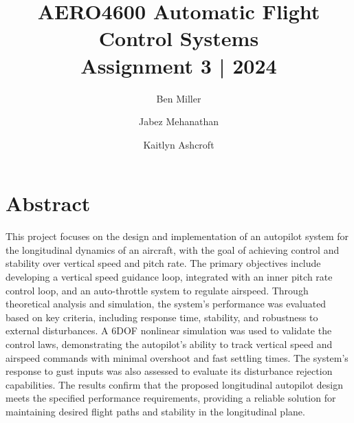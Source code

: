 \documentclass{UoNMCHA}
\numberwithin{equation}{section}
\begin{document}
\title{AERO4600 Automatic Flight Control Systems\\
{\small Assignment 3 | 2024}}

\author[UoNMCHA1]{Ben Miller}
\address[UoNMCHA1]{
Student of Aerospace Systems Engineering,\\
The University of Newcastle, Callaghan, NSW 2308, AUSTRALIA \\
Student Number: c3328484 \\
E-mail: \href{mailto:First.Last@uon.edu.au}{\textsf{c3328484@uon.edu.au}}}

\author[UoNMCHA2]{Jabez Mehanathan}
\address[UoNMCHA2]{
Student of Aerospace Systems Engineering,\\
The University of Newcastle, Callaghan, NSW 2308, AUSTRALIA \\
Student Number: c3355997 \\
E-mail: \href{mailto:First.Last@uon.edu.au}{\textsf{c3355997@uon.edu.au}}}

\author[UoNMCHA3]{Kaitlyn Ashcroft}
\address[UoNMCHA3]{
Student of Aerospace Systems Engineering,\\
The University of Newcastle, Callaghan, NSW 2308, AUSTRALIA \\
Student Number: c3350754  \\
E-mail: \href{mailto:First.Last@uon.edu.au}{\textsf{c3350754@uon.edu.au}}}
\maketitle
\onecolumn

\vspace{-5mm}
\section*{Abstract}
This project focuses on the design and implementation of an autopilot system for the longitudinal dynamics of an 
aircraft, with the goal of achieving control and stability over vertical speed and pitch rate. The primary objectives 
include developing a vertical speed guidance loop, integrated with an inner pitch rate control loop, and an auto-throttle 
system to regulate airspeed. Through theoretical analysis and simulation, the system’s performance was evaluated based on 
key criteria, including response time, stability, and robustness to external disturbances. A 6DOF nonlinear simulation was 
used to validate the control laws, demonstrating the autopilot’s ability to track vertical speed and airspeed commands with 
minimal overshoot and fast settling times. The system’s response to gust inputs was also assessed to evaluate its 
disturbance rejection capabilities. The results confirm that the proposed longitudinal autopilot design meets the specified 
performance requirements, providing a reliable solution for maintaining desired flight paths and stability in the longitudinal plane.
\end{document}
